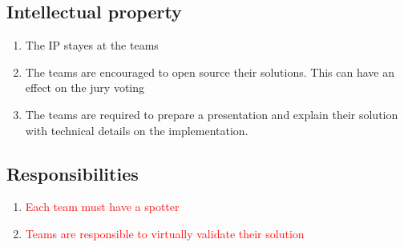 \subsection{Intellectual property}
\begin{enumerate}
	\item{The IP stayes at the teams}
	\item{The teams are encouraged to open source their solutions. This can have an effect on the jury voting}
	\item{The teams are required to prepare a presentation and explain their solution with technical details on the implementation.}
\end{enumerate}

\subsection{Responsibilities}
\begin{enumerate}
	\item{\textcolor{red}{Each team must have a spotter}}
	\item{\textcolor{red}{Teams are responsible to virtually validate their solution}}
\end{enumerate}
